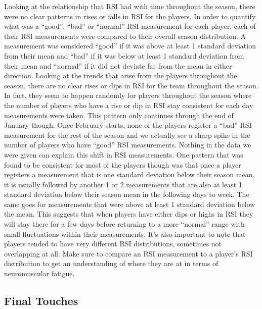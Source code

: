 \documentclass[
]{article}
\begin{document}
Looking at the relationship that RSI had with time throughout the
season, there were no clear patterns in rises or falls in RSI for the
players. In order to quantify what was a ``good'', ``bad'' or ``normal''
RSI measurement for each player, each of their RSI measurements were
compared to their overall season distribution. A measurement was
considered ``good'' if it was above at least 1 standard deviation from
their mean and ``bad'' if it was below at least 1 standard deviation
from their mean and ``normal'' if it did not deviate far from the mean
in either direction. Looking at the trends that arise from the players
throughout the season, there are no clear rises or dips in RSI for the
team throughout the season. In fact, they seem to happen randomly for
players throughout the season where the number of players who have a
rise or dip in RSI stay consistent for each day measurements were taken.
This pattern only continues through the end of January though. Once
February starts, none of the players register a ``bad'' RSI measurement
for the rest of the season and we actually see a sharp spike in the
number of players who have ``good'' RSI measurements. Nothing in the
data we were given can explain this shift in RSI measurements. One
pattern that was found to be consistent for most of the players though
was that once a player registers a measurement that is one standard
deviation below their season mean, it is usually followed by another 1
or 2 measurements that are also at least 1 standard deviation below
their season mean in the following days to week. The same goes for
measurements that were above at least 1 standard deviation below the
mean. This suggests that when players have either dips or highs in RSI
they will stay there for a few days before returning to a more
``normal'' range with small fluctuations within their measurements. It's
also important to note that players tended to have very different RSI
distributions, sometimes not overlapping at all. Make sure to compare an
RSI measurement to a player's RSI distribution to get an understanding
of where they are at in terms of neuromuscular fatigue.

\subsection{Final Touches}\label{final-touches}
\end{document}
